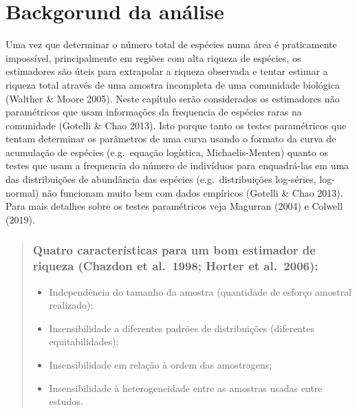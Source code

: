 \documentclass[
]{book}
\providecommand{\tightlist}{%
  \setlength{\itemsep}{0pt}\setlength{\parskip}{0pt}}
\begin{document}
\hypertarget{backgorund-da-anuxe1lise}{%
\section{Backgorund da análise}\label{backgorund-da-anuxe1lise}}

Uma vez que determinar o número total de espécies numa área é praticamente impossível, principalmente em regiões com alta riqueza de espécies, os estimadores são úteis para extrapolar a riqueza observada e tentar estimar a riqueza total através de uma amostra incompleta de uma comunidade biológica (Walther \& Moore 2005). Neste capítulo serão considerados os estimadores não paramétricos que usam informações da frequencia de espécies raras na comunidade (Gotelli \& Chao 2013). Isto porque tanto os testes paramétricos que tentam determinar os parâmetros de uma curva usando o formato da curva de acumulação de espécies (e.g.~equação logística, Michaelis-Menten) quanto os testes que usam a frequencia do número de indivíduos para enquadrá-las em uma das distribuições de abundância das espécies (e.g.~distribuições log-séries, log-normal) não funcionam muito bem com dados empíricos (Gotelli \& Chao 2013). Para mais detalhes sobre os testes paramétricos veja Magurran (2004) e Colwell (2019).

\begin{quote}
\hypertarget{quatro-caracteruxedsticas-para-um-bom-estimador-de-riqueza-chazdon-et-al.-1998-horter-et-al.-2006}{%
\subsubsection{Quatro características para um bom estimador de riqueza (Chazdon et al.~1998; Horter et al.~2006):}\label{quatro-caracteruxedsticas-para-um-bom-estimador-de-riqueza-chazdon-et-al.-1998-horter-et-al.-2006}}

\begin{itemize}
\tightlist
\item
  Independência do tamanho da amostra (quantidade de esforço amostral realizado);
\item
  Insensibilidade a diferentes padrões de distribuições (diferentes equitabilidades);
\item
  Insensibilidade em relação à ordem das amostragens;
\item
  Insensibilidade à heterogeneidade entre as amostras usadas entre estudos.
\end{itemize}
\end{quote}
\end{document}
